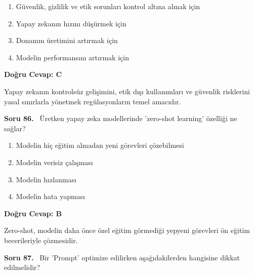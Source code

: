 \documentclass[11pt,a4paper,openany]{book}
\begin{document}
\begin{enumerate}[label=\Alph*), leftmargin=25pt, topsep=4pt, itemsep=2pt]
        \item Güvenlik, gizlilik ve etik sorunları kontrol altına almak için
        \item Yapay zekanın hızını düşürmek için
        \item Donanım üretimini artırmak için
        \item Modelin performansını artırmak için
\end{enumerate}

\vspace{4pt}
\begin{tcolorbox}[title=Cevap ve Açıklama, colback=gray!3!white, colframe=primarycolor!90!black, arc=2mm, fonttitle=\bfseries\sffamily, top=6pt, bottom=6pt]
    \textbf{Doğru Cevap: C}

    \vspace{2pt}
    Yapay zekanın kontrolsüz gelişimini, etik dışı kullanımları ve güvenlik risklerini yasal sınırlarla yönetmek regülasyonların temel amacıdır.
\end{tcolorbox}
\vspace{10pt}
\needspace{5cm}
\vspace{8pt}
\noindent\textbf{\large\sffamily Soru 86.} \ Üretken yapay zeka modellerinde 'zero-shot learning' özelliği ne sağlar?

\begin{enumerate}[label=\Alph*), leftmargin=25pt, topsep=4pt, itemsep=2pt]
        \item Modelin hiç eğitim almadan yeni görevleri çözebilmesi
        \item Modelin verisiz çalışması
        \item Modelin hızlanması
        \item Modelin hata yapması
\end{enumerate}

\vspace{4pt}
\begin{tcolorbox}[title=Cevap ve Açıklama, colback=gray!3!white, colframe=primarycolor!90!black, arc=2mm, fonttitle=\bfseries\sffamily, top=6pt, bottom=6pt]
    \textbf{Doğru Cevap: B}

    \vspace{2pt}
    Zero-shot, modelin daha önce özel eğitim görmediği yepyeni görevleri ön eğitim becerileriyle çözmesidir.
\end{tcolorbox}
\vspace{10pt}
\needspace{5cm}
\vspace{8pt}
\noindent\textbf{\large\sffamily Soru 87.} \ Bir 'Prompt' optimize edilirken aşağıdakilerden hangisine dikkat edilmelidir?
\end{document}
